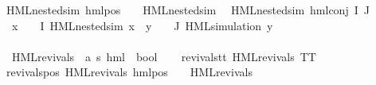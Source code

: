 \begin{isabellebody}
{\isachardoublequoteopen}HML{\isacharunderscore}{\kern0pt}{}{\isacharunderscore}{\kern0pt}nested{\isacharunderscore}{\kern0pt}sim\ {\isacharparenleft}{\kern0pt}hml{\isacharunderscore}{\kern0pt}pos\ {\isasymalpha}\ {\isasymphi}{\isacharparenright}{\kern0pt}{\isachardoublequoteclose}\ \ {\isachardoublequoteopen}HML{\isacharunderscore}{\kern0pt}{}{\isacharunderscore}{\kern0pt}nested{\isacharunderscore}{\kern0pt}sim\ {\isasymphi}{\isachardoublequoteclose}\ {\isacharbar}{\kern0pt}\isanewline
{\isachardoublequoteopen}HML{\isacharunderscore}{\kern0pt}{}{\isacharunderscore}{\kern0pt}nested{\isacharunderscore}{\kern0pt}sim\ {\isacharparenleft}{\kern0pt}hml{\isacharunderscore}{\kern0pt}conj\ I\ J\ {\isasymPhi}{\isacharparenright}{\kern0pt}{\isachardoublequoteclose}\ \isanewline
{}\ {\isachardoublequoteopen}{\isacharparenleft}{\kern0pt}{\isasymforall}x\ {\isasymin}\ {\isacharparenleft}{\kern0pt}{\isasymPhi}\ {\isacharbackquote}{\kern0pt}\ I{\isacharparenright}{\kern0pt}{\isachardot}{\kern0pt}\ HML{\isacharunderscore}{\kern0pt}{}{\isacharunderscore}{\kern0pt}nested{\isacharunderscore}{\kern0pt}sim\ x{\isacharparenright}{\kern0pt}\ {\isasymand}\ {\isacharparenleft}{\kern0pt}{\isasymforall}y\ {\isasymin}\ {\isacharparenleft}{\kern0pt}{\isasymPhi}\ {\isacharbackquote}{\kern0pt}\ J{\isacharparenright}{\kern0pt}{\isachardot}{\kern0pt}\ HML{\isacharunderscore}{\kern0pt}simulation\ y{\isacharparenright}{\kern0pt}{\isachardoublequoteclose}\isanewline
\ \ \ \ \ \ \ \ \ \ \ \ \ \ \ \ \ \ \ \ \ \ \ \ \ \ \ \ \ \ \ \ \ \ \ \ \ \ \ \ \ \ \ \ \ \ \ \ \ \ \ \ \ \ \ \ \ \ \ \ \ \ \ \ \isanewline
{}\isamarkupfalse%
\ HML{\isacharunderscore}{\kern0pt}revivals\ {\isacharcolon}{\kern0pt}{\isacharcolon}{\kern0pt}\ {\isachardoublequoteopen}{\isacharparenleft}{\kern0pt}{\isacharprime}{\kern0pt}a{\isacharcomma}{\kern0pt}\ {\isacharprime}{\kern0pt}s{\isacharparenright}{\kern0pt}\ hml\ {\isasymRightarrow}\ bool{\isachardoublequoteclose}\ \isanewline
\ \ \isanewline
revivals{\isacharunderscore}{\kern0pt}tt{\isacharcolon}{\kern0pt}\ {\isachardoublequoteopen}HML{\isacharunderscore}{\kern0pt}revivals\ TT{\isachardoublequoteclose}\ {\isacharbar}{\kern0pt}\isanewline
revivals{\isacharunderscore}{\kern0pt}pos{\isacharcolon}{\kern0pt}\ {\isachardoublequoteopen}HML{\isacharunderscore}{\kern0pt}revivals\ {\isacharparenleft}{\kern0pt}hml{\isacharunderscore}{\kern0pt}pos\ {\isasymalpha}\ {\isasymphi}{\isacharparenright}{\kern0pt}{\isachardoublequoteclose}\ \ {\isachardoublequoteopen}HML{\isacharunderscore}{\kern0pt}revivals\ {\isasymphi}{\isachardoublequoteclose}\ {\isacharbar}{\kern0pt}\isanewline

\end{isabellebody}
